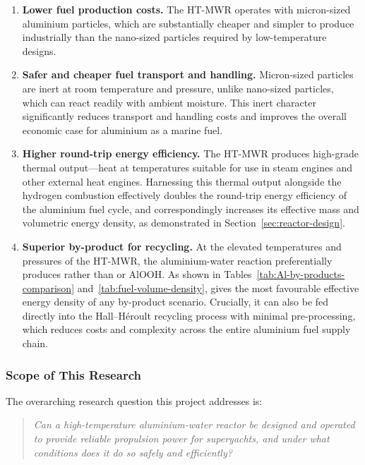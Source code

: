 \documentclass[12pt]{article}
\begin{document}
\begin{enumerate}
    \item \textbf{Lower fuel production costs.} The HT-MWR operates with 
    micron-sized aluminium particles, which are substantially cheaper and simpler 
    to produce industrially than the nano-sized particles required by low-temperature 
    designs.

    \item \textbf{Safer and cheaper fuel transport and handling.} Micron-sized 
    particles are inert at room temperature and pressure, unlike nano-sized 
    particles, which can react readily with ambient moisture. This inert character 
    significantly reduces transport and handling costs and improves the overall 
    economic case for aluminium as a marine fuel.

    \item \textbf{Higher round-trip energy efficiency.} The HT-MWR produces 
    high-grade thermal output---heat at temperatures suitable for use in steam 
    engines and other external heat engines. Harnessing this thermal output 
    alongside the hydrogen combustion effectively doubles the round-trip energy 
    efficiency of the aluminium fuel cycle, and correspondingly increases its 
    effective mass and volumetric energy density, as demonstrated in 
    Section~\ref{sec:reactor-design}.

    \item \textbf{Superior by-product for recycling.} At the elevated temperatures 
    and pressures of the HT-MWR, the aluminium-water reaction preferentially 
    produces  rather than  or AlOOH. As shown in 
    Tables~\ref{tab:Al-by-products-comparison} and~\ref{tab:fuel-volume-density},  gives 
    the most favourable effective energy density of any by-product scenario. 
    Crucially, it can also be fed directly into the Hall--H\'{e}roult recycling 
    process with minimal pre-processing, which reduces costs and complexity across 
    the entire aluminium fuel supply chain.
\end{enumerate}

\break

\subsubsection*{Scope of This Research}

The overarching research question this project addresses is:

\begin{quote}
    \textit{Can a high-temperature aluminium-water reactor be designed and operated 
    to provide reliable propulsion power for superyachts, and under what conditions 
    does it do so safely and efficiently?}
\end{quote}
\end{document}
